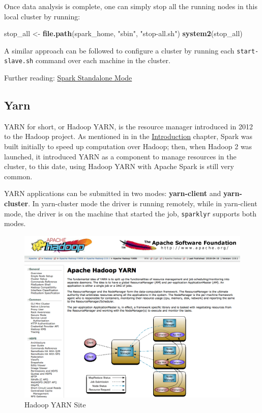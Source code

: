 \documentclass[]{book}
\newenvironment{Shaded}{\begin{snugshade}}{\end{snugshade}}
\newcommand{\KeywordTok}[1]{\textcolor[rgb]{0.13,0.29,0.53}{\textbf{#1}}}
\newcommand{\NormalTok}[1]{#1}
\newcommand{\StringTok}[1]{\textcolor[rgb]{0.31,0.60,0.02}{#1}}
\theoremstyle{definition}
\theoremstyle{definition}
\theoremstyle{definition}
\theoremstyle{remark}
\begin{document}
Once data analysis is complete, one can simply stop all the running
nodes in this local cluster by running:

\begin{Shaded}
\begin{Highlighting}[]
\NormalTok{stop_all <-}\StringTok{ }\KeywordTok{file.path}\NormalTok{(spark_home, }\StringTok{"sbin"}\NormalTok{, }\StringTok{"stop-all.sh"}\NormalTok{)}
\KeywordTok{system2}\NormalTok{(stop_all)}
\end{Highlighting}
\end{Shaded}

A similar approach can be followed to configure a cluster by running
each \texttt{start-slave.sh} command over each machine in the cluster.

Further reading:
\href{https://spark.apache.org/docs/latest/spark-standalone.html}{Spark
Standalone Mode}

\hypertarget{yarn}{%
\subsection{Yarn}\label{yarn}}

YARN for short, or Hadoop YARN, is the resource manager introduced in
2012 to the Hadoop project. As mentioned in in the
\protect\hyperlink{intro}{Introduction} chapter, Spark was built
initially to speed up computation over Hadoop; then, when Hadoop 2 was
launched, it introduced YARN as a component to manage resources in the
cluster, to this date, using Hadoop YARN with Apache Spark is still very
common.

YARN applications can be submitted in two modes: \textbf{yarn-client}
and \textbf{yarn-cluster}. In yarn-cluster mode the driver is running
remotely, while in yarn-client mode, the driver is on the machine that
started the job, \texttt{sparklyr} supports both modes.

\begin{figure}

{\centering \includegraphics[width=13.78in]{images/05-clusters-yarn} 

}

\caption{Hadoop YARN Site}\label{fig:hadoop-yarn}
\end{figure}
\end{document}
